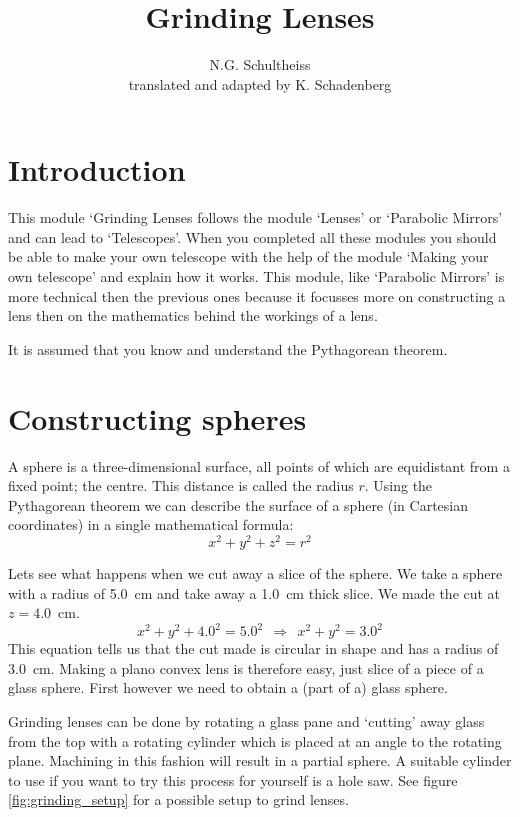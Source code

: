 \documentclass[12pt,a4paper]{article}
\author{N.G. Schultheiss \\ translated and adapted by K. Schadenberg}
\date{}
\title{Grinding Lenses}
\numberwithin{equation}{section}
\numberwithin{figure}{section}
\numberwithin{table}{section}
\begin{document}
\maketitle

\section{Introduction}
This module `Grinding Lenses follows the module `Lenses' or `Parabolic Mirrors' and can lead to `Telescopes'. When you completed all these modules you should be able to make your own telescope with the help of the module `Making your own telescope' and explain how it works. This module, like `Parabolic Mirrors' is more technical then the previous ones because it focusses more on constructing a lens then on the mathematics behind the workings of a lens.

It is assumed that you know and understand the Pythagorean theorem.

\section{Constructing spheres}
A sphere is a three-dimensional surface, all points of which are equidistant from a fixed point; the centre. This distance is called the radius $r$. Using the Pythagorean theorem we can describe the surface of a sphere (in Cartesian coordinates) in a single mathematical formula:
\begin{equation}
x^2 + y^2 + z^2 = r^2 \label{eq:sphere}
\end{equation}

Lets see what happens when we cut away a slice of the sphere. We take a sphere with a radius of 5.0~cm and take away a 1.0~cm thick slice. We made the cut at $z=4.0$~cm.
\begin{equation*}
x^2 + y^2 + 4.0^2 = 5.0^2 ~~\Rightarrow~~ x^2 + y^2 = 3.0^2
\end{equation*}
This equation tells us that the cut made is circular in shape and has a radius of 3.0~cm. Making a plano convex lens is therefore easy, just slice of a piece of a glass sphere. First however we need to obtain a (part of a) glass sphere.

Grinding lenses can be done by rotating a glass pane and `cutting' away glass from the top with a rotating cylinder which is placed at an angle to the rotating plane. Machining in this fashion will result in a partial sphere. A suitable cylinder to use if you want to try this process for yourself is a hole saw. See figure \ref{fig:grinding_setup} for a possible setup to grind lenses.
\end{document}
